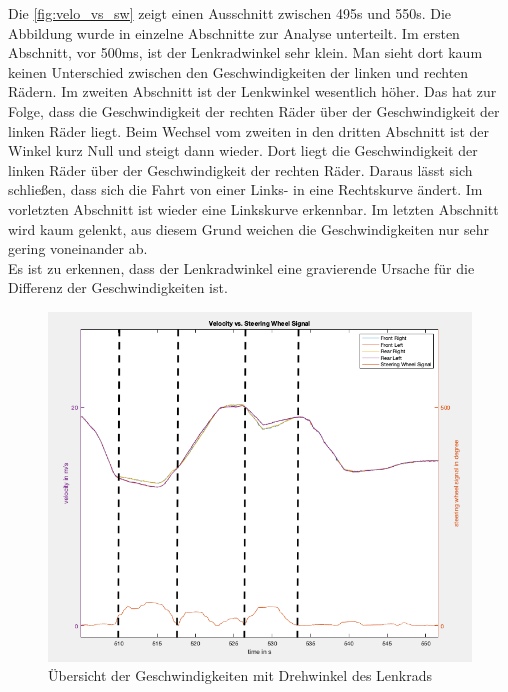 	Die \autoref{fig:velo_vs_sw} zeigt einen Ausschnitt zwischen 495s und 550s. Die Abbildung wurde in einzelne Abschnitte zur Analyse unterteilt. Im ersten Abschnitt, vor 500ms, ist der Lenkradwinkel sehr klein. Man sieht dort kaum keinen Unterschied zwischen den Geschwindigkeiten der linken und rechten Rädern. Im zweiten Abschnitt ist der Lenkwinkel wesentlich höher. Das hat zur Folge, dass die Geschwindigkeit der rechten Räder über der Geschwindigkeit der linken Räder liegt. Beim Wechsel vom zweiten in den dritten Abschnitt ist der Winkel kurz Null und steigt dann wieder. Dort liegt die Geschwindigkeit der linken Räder über der Geschwindigkeit der rechten Räder. Daraus lässt sich schließen, dass sich die Fahrt von einer Links- in eine Rechtskurve ändert. Im vorletzten Abschnitt ist wieder eine Linkskurve erkennbar. Im letzten Abschnitt wird kaum gelenkt, aus diesem Grund weichen die Geschwindigkeiten nur sehr gering voneinander ab.\\
Es ist zu erkennen, dass der Lenkradwinkel eine gravierende Ursache für die Differenz der Geschwindigkeiten ist.
\begin{figure}[h!]
	\centering
	\includegraphics[width=1\linewidth]{../Graphiken/velo_vs_sw}
	\caption{Übersicht der Geschwindigkeiten mit Drehwinkel des Lenkrads}
	\label{fig:velo_vs_sw}
\end{figure}
